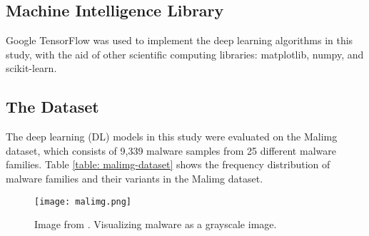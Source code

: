 \documentclass[sigconf]{acmart}
\begin{document}
\subsection{Machine Intelligence Library}
Google TensorFlow\cite{tensorflow2015-whitepaper} was used to implement the deep learning algorithms in this study, with the aid of other scientific computing libraries: matplotlib\cite{Hunter:2007}, numpy\cite{walt2011numpy}, and scikit-learn\cite{scikit-learn}. 

\subsection{The Dataset}

The deep learning (DL) models in this study were evaluated on the Malimg dataset\cite{nataraj2011malware}, which consists of 9,339 malware samples from 25 different malware families. Table \ref{table: malimg-dataset} shows the frequency distribution of malware families and their variants in the Malimg dataset\cite{nataraj2011malware}.
\begin{figure}[!htb]
	\centering
		\texttt{[image: malimg.png]}
		\caption{Image from \cite{nataraj2011malware}. Visualizing malware as a grayscale image.}
		\label{malimg}
	\endminipage\hfill
\end{figure}
\end{document}
